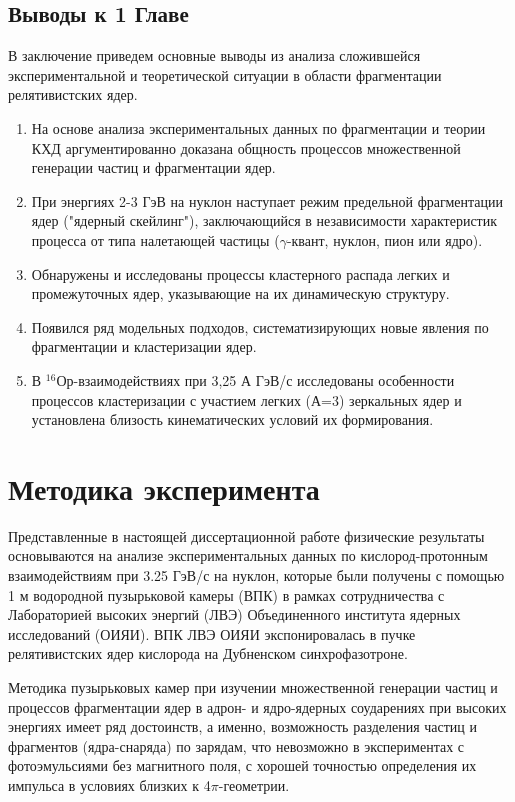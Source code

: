 \documentclass[fontsize=14pt]{scrarticle}
\begin{document}
\subsection*{Выводы к 1 Главе}
\hspace{0.6cm}
В заключение приведем основные выводы из анализа сложившейся
экспериментальной и теоретической ситуации в области фрагментации
релятивистских ядер.
\begin{enumerate}
    \item На основе анализа экспериментальных данных по фрагментации и теории КХД аргументированно доказана общность процессов множественной генерации частиц и фрагментации ядер.
    \item При энергиях 2-3 ГэВ на нуклон наступает режим предельной фрагментации ядер ("ядерный скейлинг"), заключающийся в независимости характеристик процесса от типа налетающей частицы ($\gamma$-квант, нуклон, пион или ядро).
    \item Обнаружены и исследованы процессы кластерного распада легких и промежуточных ядер, указывающие на их динамическую структуру.
    \item Появился ряд модельных подходов, систематизирующих новые явления по фрагментации и кластеризации ядер.
    \item В $^{16}$Ор-взаимодействиях при 3,25 А ГэВ/с исследованы особенности процессов кластеризации с участием легких (А=3) зеркальных ядер и установлена близость кинематических условий их формирования.
\end{enumerate}

\section{Методика эксперимента}
\hspace{0.6cm}Представленные в настоящей диссертационной работе физические результаты основываются на анализе экспериментальных данных по кислород-протонным взаимодействиям при 3.25 ГэВ/с на нуклон, которые были получены с помощью 1 м водородной пузырьковой камеры (ВПК) в
рамках сотрудничества с Лабораторией высоких энергий (ЛВЭ)
Объединенного института ядерных исследований (ОИЯИ). ВПК ЛВЭ ОИЯИ
экспонировалась в пучке релятивистских ядер кислорода на Дубненском
синхрофазотроне.

Методика пузырьковых камер при изучении множественной генерации
частиц и процессов фрагментации ядер в адрон- и ядро-ядерных соударениях при высоких энергиях имеет ряд достоинств, а именно, возможность разделения частиц и фрагментов (ядра-снаряда) по зарядам, что невозможно в экспериментах с фотоэмульсиями без магнитного поля, с хорошей точностью определения их импульса в условиях близких к 4$\pi$-геометрии.
\end{document}
